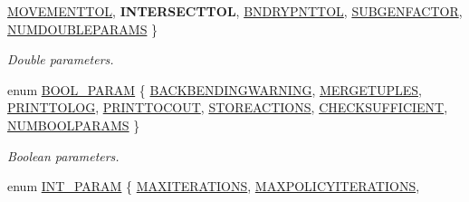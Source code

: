 \begin{DoxyCompactItemize}
\hyperlink{namespaceSG_ac2f86c953fcec4419ac86538d9d314b6a8c139c0f5b03530e6d113e284375479f}{M\+O\+V\+E\+M\+E\+N\+T\+T\+OL}, 
{\bfseries I\+N\+T\+E\+R\+S\+E\+C\+T\+T\+OL}, 
\hyperlink{namespaceSG_ac2f86c953fcec4419ac86538d9d314b6a78f61f511c0bd584c31097c59733e3e9}{B\+N\+D\+R\+Y\+P\+N\+T\+T\+OL}, 
\hyperlink{namespaceSG_ac2f86c953fcec4419ac86538d9d314b6ac010a025bb49cc646ecac1a7e8606a40}{S\+U\+B\+G\+E\+N\+F\+A\+C\+T\+OR}, 
\newline
\hyperlink{namespaceSG_ac2f86c953fcec4419ac86538d9d314b6a5abae44509e90e4b4033308e5e581265}{N\+U\+M\+D\+O\+U\+B\+L\+E\+P\+A\+R\+A\+MS}
 \}\begin{DoxyCompactList}\small\item\em Double parameters. \end{DoxyCompactList}
\item 
enum \hyperlink{namespaceSG_a0b164afe6c58be3386d9e3f6e857b673}{B\+O\+O\+L\+\_\+\+P\+A\+R\+AM} \{ \newline
\hyperlink{namespaceSG_a0b164afe6c58be3386d9e3f6e857b673a0c2a17ce45bb4914b681b37a5c429337}{B\+A\+C\+K\+B\+E\+N\+D\+I\+N\+G\+W\+A\+R\+N\+I\+NG}, 
\hyperlink{namespaceSG_a0b164afe6c58be3386d9e3f6e857b673aa638e046b3c435b78f608dc4e95beedb}{M\+E\+R\+G\+E\+T\+U\+P\+L\+ES}, 
\hyperlink{namespaceSG_a0b164afe6c58be3386d9e3f6e857b673a06ec3d2c8c659409498ed460b891d8ad}{P\+R\+I\+N\+T\+T\+O\+L\+OG}, 
\hyperlink{namespaceSG_a0b164afe6c58be3386d9e3f6e857b673aad2bf1cd72ad79ca43109a289a7c4e17}{P\+R\+I\+N\+T\+T\+O\+C\+O\+UT}, 
\newline
\hyperlink{namespaceSG_a0b164afe6c58be3386d9e3f6e857b673aa33524feb0d1ae26b7b33129a11a8c86}{S\+T\+O\+R\+E\+A\+C\+T\+I\+O\+NS}, 
\hyperlink{namespaceSG_a0b164afe6c58be3386d9e3f6e857b673afbcc8a6740e5265359c937980a6e82fa}{C\+H\+E\+C\+K\+S\+U\+F\+F\+I\+C\+I\+E\+NT}, 
\hyperlink{namespaceSG_a0b164afe6c58be3386d9e3f6e857b673a5efcccb091917d7d685423ee7e2569fe}{N\+U\+M\+B\+O\+O\+L\+P\+A\+R\+A\+MS}
 \}\begin{DoxyCompactList}\small\item\em Boolean parameters. \end{DoxyCompactList}
\item 
enum \hyperlink{namespaceSG_a031898e6fc0fa14d8590f85da9715f37}{I\+N\+T\+\_\+\+P\+A\+R\+AM} \{ \newline
\hyperlink{namespaceSG_a031898e6fc0fa14d8590f85da9715f37aa54461b94332ae42ee530497dd5f29d0}{M\+A\+X\+I\+T\+E\+R\+A\+T\+I\+O\+NS}, 
\hyperlink{namespaceSG_a031898e6fc0fa14d8590f85da9715f37a51793514798f90b7081a75d65b29b85f}{M\+A\+X\+P\+O\+L\+I\+C\+Y\+I\+T\+E\+R\+A\+T\+I\+O\+NS}, 

\end{DoxyCompactItemize}
